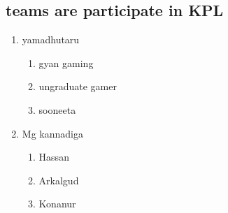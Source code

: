 \documentclass[6pt,a4paper]{report}
\begin{document}
\begin{small}
\subsection*{teams are participate in KPL} 
\begin{enumerate} 
\item yamadhutaru 
\begin{enumerate} 
\item gyan gaming 
\item ungraduate gamer 
\item sooneeta 
\end{enumerate} 
\item Mg kannadiga 
\begin{enumerate} 
\item Hassan 
\item Arkalgud 
\item Konanur
\end{enumerate} 
\end{enumerate} 
\end{small}
\end{document}
